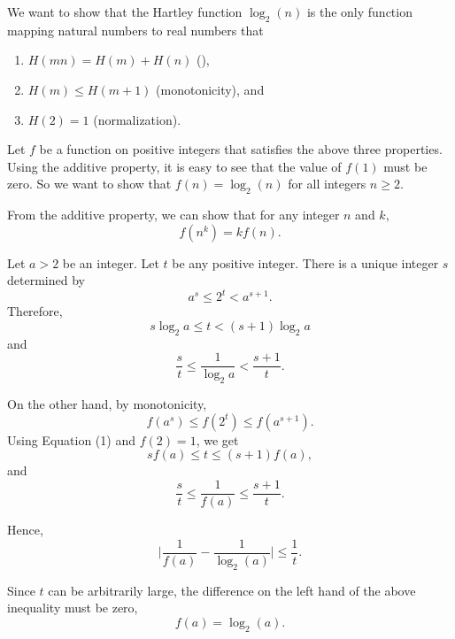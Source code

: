 \documentclass[12pt]{article}
\begin{document}

We want to show that the Hartley function $\log_2(n)$ is the only
function mapping natural numbers to real numbers that
\begin{enumerate}
\item $H(mn) = H(m)+H(n)$ (),

\item $H(m) \leq H(m+1)$ (monotonicity), and

\item $H(2)=1$  (normalization).
\end{enumerate}

Let $f$ be a function on positive integers that satisfies the above three properties. Using the additive property, it is easy to see that the value of $f(1)$ must be zero. So we want to show that $f(n) = \log_2(n)$ for all integers $n\geq 2$.


From the additive property, we can show that for any integer $n$
and $k$,
\begin{equation}
f(n^k) = kf(n).
\end{equation}


Let $a>2$  be an integer.  Let $t$ be any positive integer. There is a unique
integer $s$ determined by
\[
  a^s \leq 2^t < a^{s+1}.
\]
Therefore,
\[
  s \log_2 a\leq t < (s+1) \log_2 a
\]
and
\[
 \frac{s}{t} \leq \frac{1}{\log_2 a} < \frac{s+1}{t}.
\]

On the other hand, by monotonicity,
\[
 f(a^s) \leq f(2^t) \leq f(a^{s+1}).
\]
Using Equation (1) and $f(2)=1$, we get
\[
 s f(a) \leq t  \leq (s+1) f(a),
\]
and
\[
 \frac{s}{t} \leq \frac{1}{f(a)} \leq \frac{s+1}{t}.
\]

Hence,
\[
 \Big| \frac{1}{f(a)} - \frac{1}{\log_2(a)} \Big| \leq
 \frac{1}{t}.
\]

Since $t$ can be arbitrarily large, the difference on the left
hand  of the above inequality must be zero,
\[
 f(a) = \log_2(a).
\]

\end{document}

